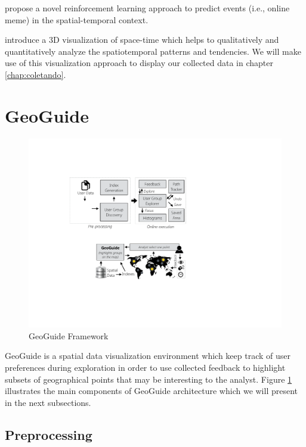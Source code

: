  propose a novel reinforcement learning approach to predict events (i.e., online meme) in the spatial-temporal context.

 introduce a 3D visualization of space-time which helps to qualitatively and quantitatively analyze the spatiotemporal patterns and tendencies. We will make use of this visualization approach to display our collected data in chapter \ref{chap:coletando}.

\section{GeoGuide}

\begin{figure}[t]
	\centering
	\includegraphics[width=\columnwidth]{imagens/framework}
	\caption{GeoGuide Framework}
	\label{fig:framework}
	\vspace{-10pt}
\end{figure}

GeoGuide \cite{omidvarTehrani2017} is a spatial data visualization environment which keep track of user preferences during exploration in order to use collected feedback to highlight subsets of geographical points that may be interesting to the analyst. Figure \ref{fig:framework} illustrates the main components of GeoGuide architecture which we will present in the next subsections.

\subsection{Preprocessing}

